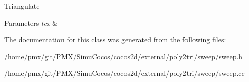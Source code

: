 Triangulate


\begin{DoxyParams}{Parameters}
{\em tcx} & \\
\hline
\end{DoxyParams}


The documentation for this class was generated from the following files\+:\begin{DoxyCompactItemize}
\item 
/home/pmx/git/\+P\+M\+X/\+Simu\+Cocos/cocos2d/external/poly2tri/sweep/sweep.\+h\item 
/home/pmx/git/\+P\+M\+X/\+Simu\+Cocos/cocos2d/external/poly2tri/sweep/sweep.\+cc\end{DoxyCompactItemize}
